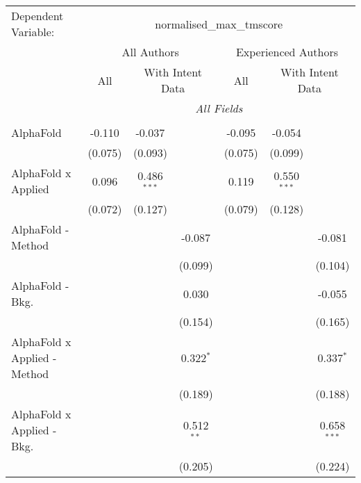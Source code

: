 \begingroup
\centering
\begin{tabular}{lcccccc}
   \tabularnewline \midrule \midrule
   Dependent Variable: & \multicolumn{6}{c}{normalised\_max\_tmscore}\\
 & \multicolumn{3}{c}{All Authors} & \multicolumn{3}{c}{Experienced Authors} \\
\cmidrule(lr){2-4} \cmidrule(lr){5-7}
 & \multicolumn{1}{c}{All} & \multicolumn{2}{c}{With Intent Data} & \multicolumn{1}{c}{All} & \multicolumn{2}{c}{With Intent Data} \\
\cmidrule(lr){2-2} \cmidrule(lr){3-4} \cmidrule(lr){5-5} \cmidrule(lr){6-7}
 & \multicolumn{6}{c}{\textit{All Fields}} \\ \\
   AlphaFold                      & -0.110       & -0.037        &               & -0.095       & -0.054        &   \\   
                                  & (0.075)      & (0.093)       &               & (0.075)      & (0.099)       &   \\   
   AlphaFold x Applied            & 0.096        & 0.486$^{***}$ &               & 0.119        & 0.550$^{***}$ &   \\   
                                  & (0.072)      & (0.127)       &               & (0.079)      & (0.128)       &   \\   
   AlphaFold - Method             &              &               & -0.087        &              &               & -0.081\\   
                                  &              &               & (0.099)       &              &               & (0.104)\\   
   AlphaFold - Bkg.               &              &               & 0.030         &              &               & -0.055\\   
                                  &              &               & (0.154)       &              &               & (0.165)\\   
   AlphaFold x Applied - Method   &              &               & 0.322$^{*}$   &              &               & 0.337$^{*}$\\   
                                  &              &               & (0.189)       &              &               & (0.188)\\   
   AlphaFold x Applied - Bkg.     &              &               & 0.512$^{**}$  &              &               & 0.658$^{***}$\\   
                                  &              &               & (0.205)       &              &               & (0.224)\\   

\end{tabular}
